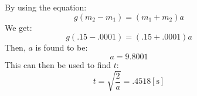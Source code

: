 \documentclass{article}
\begin{document}
\begin{figure}[ht]
\begin{minipage}[b]{0.45\linewidth}
\vspace{36pt}
By using the equation:
$$g(m_2-m_1) = (m_1+m_2)a$$ 
We get:
$$g(.15-.0001) = (.15+.0001)a$$
Then, $a$ is found to be:
$$a = 9.8001$$
This can then be used to find $t$:
$$t = \sqrt{\frac{2}{a}} = .4518[\si{\second}]$$
\vspace{36pt}
\end{minipage}
\hfill\vline\hfill
\begin{minipage}[b]{0.45\linewidth}
\centering
{} %

\end{minipage}
\end{figure}
\end{document}

